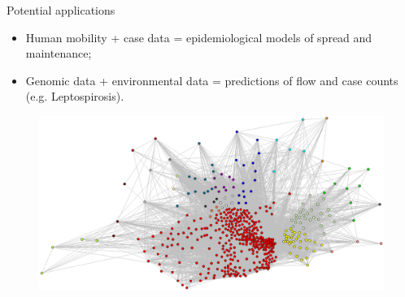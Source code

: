 \documentclass[newPxFont,numfooter,sectionpages]{beamer}
\begin{document}
\begin{frame}{Potential applications}
\begin{itemize}
 \item Human mobility + case data = epidemiological models of spread and maintenance;
 \item Genomic data + environmental data = predictions of flow and case counts (e.g. Leptospirosis).
 
\end{itemize}
\begin{figure}
	\includegraphics[scale=.30]{figures/mobility_network.png} 
\end{figure}
\end{frame}

% 
% 
\end{document}

